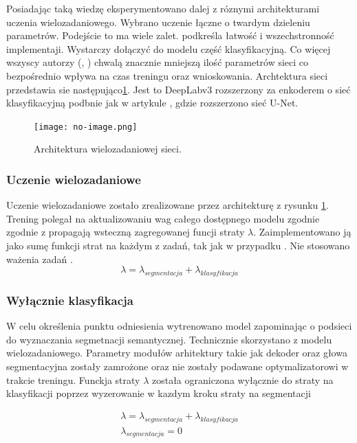 Posiadając taką wiedzę eksperymentowano dalej z róznymi architekturami uczenia wielozadaniowego. Wybrano uczenie łączne o twardym dzieleniu parametrów. Podejście to ma wiele zalet. \cite{mehta2018net} podkreśla łatwość i wszechstronność implementaji. Wystarczy dołączyć do modelu część klasyfikacyjną. Co więcej wszyscy autorzy (\cite{mehta2018net}, \cite{9892852}) chwalą znacznie mniejszą ilość parametrów sieci co bezpośrednio wpływa na czas treningu oraz wnioskowania. Archtektura sieci przedstawia sie następująco\ref{fig:multitask}. Jest to DeepLabv3 rozszerzony za enkoderem o sieć klasyfikacyjną podbnie jak w artykule \cite{mehta2018net}, gdzie rozszerzono sieć U-Net.
\begin{figure}[ht!]
    \centering
    \texttt{[image: no-image.png]}
    \caption{Architektura wielozadaniowej sieci.}
    \label{fig:multitask}
\end{figure}

\subsubsection{Uczenie wielozadaniowe}
Uczenie wielozadaniowe zostało zrealizowane przez architekturę z rysunku \ref{fig:multitask}. Trening polegał na aktualizowaniu wag całego dostępnego modelu zgodnie zgodnie z propagają wsteczną zagregowanej funcji straty $\lambda$. Zaimplementowano ją jako sumę funkcji strat na każdym z zadań, tak jak w przypadku \cite{mehta2018net}. Nie stosowano ważenia zadań \cite{9892852}.
\begin{equation*}
    \lambda = \lambda_{segmentacja} + \lambda_{klasyfikacja}
\end{equation*}

\subsubsection{Wyłącznie klasyfikacja}
W celu określenia punktu odniesienia wytrenowano model zapominając o podsieci do wyznaczania segmetnacji semantycznej. Technicznie skorzystano z modelu wielozadaniowego. Parametry modułów arhitektury takie jak dekoder oraz głowa segmentacyjna zostały zamrożone oraz nie zostały podawane optymalizatorowi w trakcie treningu. Funckja straty $\lambda$ została ograniczona wyłącznie do straty na klasyfikacji poprzez wyzerowanie w kazdym kroku straty na segmentacji

\begin{gather*}
    \lambda = \lambda_{segmentacja} + \lambda_{klasyfikacja} \\
    \lambda_{segmentacja} = 0
\end{gather*}

